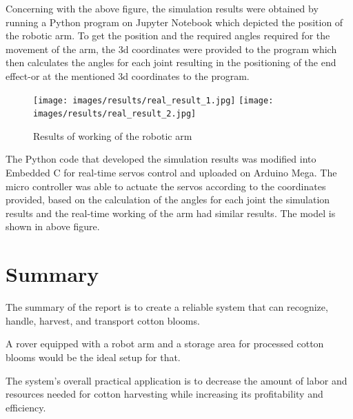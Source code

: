 \documentclass[12pt,a4paper]{report}
\begin{document}
\begin{enumerate}
\par Concerning with the above figure, the simulation results were obtained by running a Python program on Jupyter Notebook which depicted the position of the robotic arm. To get the position and the required angles required for the movement of the arm, the 3d coordinates were provided to the program which then calculates the angles for each joint resulting in the positioning of the end effect-or at the mentioned 3d coordinates to the program.

\begin{figure}[H]
\begin{center}
\texttt{[image: images/results/real\_result\_1.jpg]}
\hspace{0.2in}
\texttt{[image: images/results/real\_result\_2.jpg]}
\caption{Results of working of the robotic arm}
\end{center}
\end{figure}

\par 
The Python code that developed the simulation results was modified into Embedded C for real-time servos control and uploaded on Arduino Mega. The micro controller was able to actuate the servos according to the coordinates provided, based on the calculation of the angles for each joint the simulation results and the real-time working of the arm had similar results. The model is shown in above figure.














\end{enumerate} 


\newpage




\section {Summary}

\par The summary of the report is to create a reliable system that can recognize, handle, harvest, and transport cotton blooms.

\par A rover equipped with a robot arm and a storage area for processed cotton blooms would be the ideal setup for that.

\par The system's overall practical application is to decrease the amount of labor and resources needed for cotton harvesting while increasing its profitability and efficiency.
\end{document}
